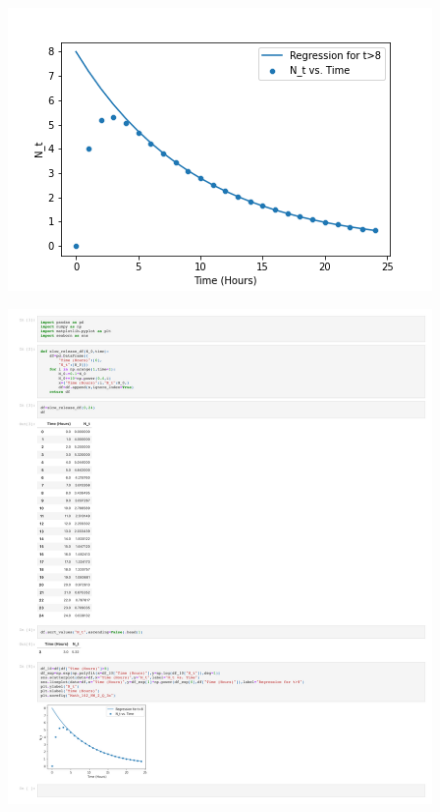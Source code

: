 \documentclass[addpoints, 11pt]{exam}
\begin{document}
\begin{questions}
\begin{parts}
	\begin{figure}[H]
		\centering
		\includegraphics[scale=0.5]{Math_142_HW_2_Q_3a.png}
	\end{figure}
	\begin{figure}[H]
		\centering
		\includegraphics[scale=0.3]{Math_142_Homework_2_Q_3.pdf}
	\end{figure}
\end{parts}

\end{questions}
\end{document}
